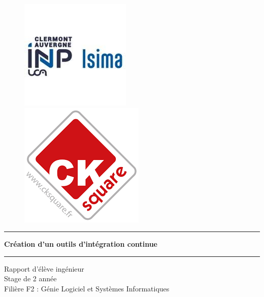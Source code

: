 \begin{titlepage}
  \hspace{\fill}
  \begin{figure}[!htb]
     \begin{minipage}{0.50\textwidth}
       \centering
       \includegraphics[scale=0.8]{./img/logo_isima_inp.jpeg}
     \end{minipage}\hfill
     \begin{minipage}{0.50\textwidth}
       \centering
       \includegraphics[scale=0.4]{./img/logo-ck.png}%
     \end{minipage}
  \end{figure}
  \begin{center}
    \vspace*{1cm}

    \par\noindent\rule{\textwidth}{0.5pt}
    \Huge
    \textbf{Création d'un outils d'intégration continue}
    \par\noindent\rule{\textwidth}{0.5pt}

    \vspace{0.2cm}
    \LARGE
    Rapport d'élève ingénieur\\
    Stage de 2 année\\
    Filière F2 : Génie Logiciel et Systèmes Informatiques

    \vspace{1.5cm}


\end{center}
\end{titlepage}
